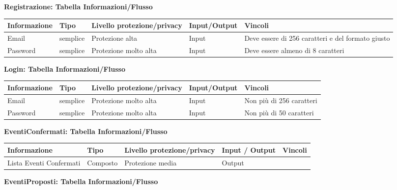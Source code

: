 \hfill \break
\clearpage
\textbf{Registrazione: Tabella Informazioni/Flusso}
\hfill \break

\begin{tabular} {|P{3cm}|P{2.5cm}|P{3cm}|P{3cm}|P{3cm}|}
    \hline
    \textbf{Informazione} & \textbf{Tipo} & \textbf{Livello protezione/privacy} & \textbf{Input/Output} & \textbf{Vincoli}                                  \\
    \hline
    Email                 & semplice      & Protezione alta                     & Input                 & Deve essere di 256 caratteri e del formato giusto \\
    \hline
    Password              & semplice      & Protezione molto alta               & Input                 & Deve essere almeno di 8 caratteri                 \\
    \hline
\end{tabular}
\hfill \break

\textbf{Login: Tabella Informazioni/Flusso}
\hfill \break

\begin{tabular} {|P{3cm}|P{2.5cm}|P{3cm}|P{3cm}|P{3cm}|}
    \hline
    \textbf{Informazione} & \textbf{Tipo} & \textbf{Livello protezione/privacy} & \textbf{Input/Output} & \textbf{Vincoli}         \\
    \hline
    Email                 & semplice      & Protezione molto alta               & Input                 & Non più di 256 caratteri \\
    \hline
    Password              & semplice      & Protezione molto alta               & Input                 & Non più di 50 caratteri  \\
    \hline
\end{tabular}
\hfill \break

\textbf{EventiConfermati: Tabella Informazioni/Flusso}
\hfill \break

\begin{tabular} {|P{3cm}|P{2.5cm}|P{3cm}|P{3cm}|P{3cm}|}
    \hline
    \textbf{Informazione}   & \textbf{Tipo} & \textbf{Livello protezione/privacy} & \textbf{Input / Output} & \textbf{Vincoli} \\
    \hline
    Lista Eventi Confermati & Composto      & Protezione media                    & Output                  &                  \\
    \hline
\end{tabular}
\hfill \break

\textbf{EventiProposti: Tabella Informazioni/Flusso}
\hfill \break


